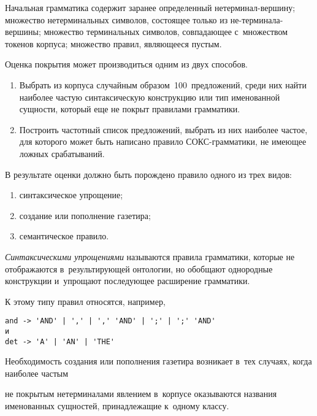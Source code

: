 \begin{multicols}{2}
  Начальная грамматика содержит заранее определенный  
не\-тер\-ми\-нал-вер\-ши\-ну; множество нетерминальных символов, состоящее 
только из не-\linebreak тер\-ми\-на\-ла-вер\-ши\-ны; множество терминальных симво\-лов, 
совпадающее с~множеством токенов корпуса; множество правил, являющееся 
пустым.
  
  Оценка покрытия может производиться одним из двух способов.
  \begin{enumerate}[1.]
\item Выбрать из корпуса случайным образом~100~предложений, среди них 
найти наиболее частую синтаксическую конструкцию или тип именованной 
сущности, который еще не покрыт правилами грамматики.\\[-15pt]
\item Построить частотный список предложений, выбрать из них наиболее 
частое, для которого может быть написано правило СОКС-грам\-ма\-ти\-ки, 
не имеющее ложных срабатываний.
\end{enumerate}

  В результате оценки должно быть порождено правило одного из трех видов:
  \begin{enumerate}[(1)]
\item синтаксическое упрощение;\\[-15pt]
\item создание или пополнение газетира;\\[-15pt]
\item семантическое правило.
\end{enumerate}

  \textit{Синтаксическими упрощениями} называются прави\-ла грамматики, 
которые не отображаются в~результирующей онтологии, но обобщают 
однородные конструкции и~упрощают последующее расширение грамматики.
  
  К этому типу правил относятся, например,
  
\noindent
{\small
  \begin{verbatim}
and -> 'AND' | ',' | ',' 'AND' | ';' | ';' 'AND'
и
det -> 'A' | 'AN' | 'THE'
\end{verbatim}

}

  Необходимость создания или пополнения газетира возникает в~тех случаях, 
когда наиболее частым\linebreak\vspace*{-12pt}

\pagebreak

\noindent
 не покрытым нетерминалами явлением в~корпусе 
оказываются названия именованных сущностей, принадлежащие к~одному 
классу.
  

\end{multicols}
